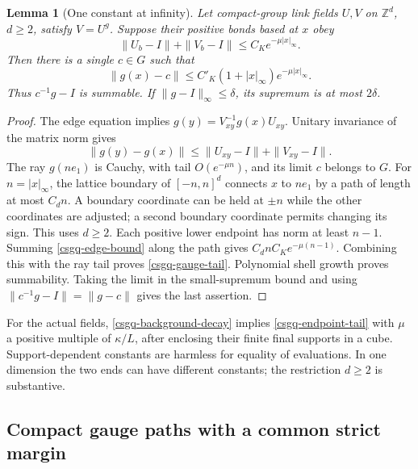 \documentclass[11pt]{article}
\newtheorem{lemma}[theorem]{Lemma}
\theoremstyle{remark}
\begin{document}
\begin{lemma}[One constant at infinity]
\label{csgq-constant-lemma}
Let compact-group link fields $U,V$ on $\mathbb Z^d$, $d\ge2$, satisfy
$V=U^g$. Suppose their positive bonds based at $x$ obey
\begin{equation}
       \|U_b-I\|+\|V_b-I\|\le C_K e^{-\mu|x|_\infty}.
 \label{csgq-endpoint-tail}
\end{equation}
Then there is a single $c\in G$ such that
\begin{equation}
 \|g(x)-c\|\le C'_K(1+|x|_\infty)e^{-\mu|x|_\infty}.
 \label{csgq-gauge-tail}
\end{equation}
Thus $c^{-1}g-I$ is summable. If $\|g-I\|_\infty\le\delta$, its
supremum is at most $2\delta$.
\end{lemma}
\begin{proof}
The edge equation implies $g(y)=V_{xy}^{-1}g(x)U_{xy}$.
Unitary invariance of the matrix norm gives
\begin{equation}
       \|g(y)-g(x)\|\le\|U_{xy}-I\|+\|V_{xy}-I\|.
 \label{csgq-edge-bound}
\end{equation}
The ray $g(ne_1)$ is Cauchy, with tail $O(e^{-\mu n})$, and
its limit $c$ belongs to $G$. For $n=|x|_\infty$, the lattice boundary
of $[-n,n]^d$ connects $x$ to $ne_1$ by a path of length at most
$C_dn$. A boundary coordinate can be held at $\pm n$ while the other
coordinates are adjusted; a second boundary coordinate permits changing
its sign. This uses $d\ge2$. Each positive lower endpoint has norm at
least $n-1$. Summing \eqref{csgq-edge-bound} along the path gives
$C_dnC_Ke^{-\mu(n-1)}$. Combining this with the ray tail proves
\eqref{csgq-gauge-tail}. Polynomial shell growth proves summability.
Taking the limit in the small-supremum bound and using
$\|c^{-1}g-I\|=\|g-c\|$ gives the last assertion.
\end{proof}

For the actual fields, \eqref{csgq-background-decay} implies
\eqref{csgq-endpoint-tail} with $\mu$ a positive multiple of
$\kappa/L$, after enclosing their finite final supports in a cube.
Support-dependent constants are harmless for equality of evaluations.
In one dimension the two ends can have different constants; the
restriction $d\ge2$ is substantive.

\subsection{Compact gauge paths with a common strict margin}
\label{csgq-path-section}
\end{document}
